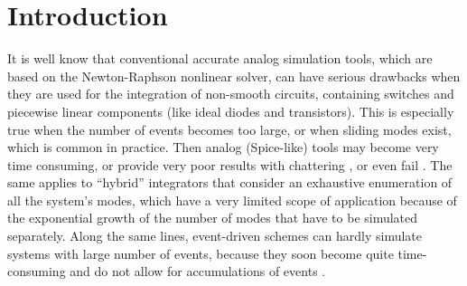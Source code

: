 

\section{Introduction}
It is well know that conventional accurate analog simulation tools, which are based on the Newton-Raphson nonlinear solver, can have serious drawbacks when they are used for the integration of non-smooth circuits, containing switches and piecewise linear components (like ideal diodes and transistors). This is especially true when the number of events becomes too large, or when sliding modes exist, which is common in practice. Then analog ({\sc Spice}-like) tools  may become very time consuming, or provide very poor results with chattering \cite{galias2006}, or even fail \cite{maffezzoni2006,yuan2003,mayaram2000,chung1994,biolek2007}. The same applies to ``hybrid'' integrators that consider an exhaustive enumeration of all the system's modes, which have a very limited scope of application because of the exponential growth of the number of modes that have to be simulated separately. Along the same lines, event-driven schemes can hardly simulate systems with large number of events, because they soon become quite time-consuming and do not allow for accumulations of events \cite{acary-brogliato2008}. 

